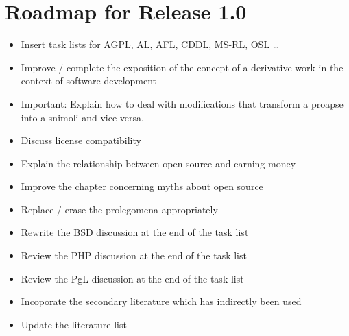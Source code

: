 %
%
%
%


\chapter*{Roadmap for Release 1.0} 

\begin{footnotesize}
\begin{itemize}
  \item Insert task lists for AGPL, AL, AFL, CDDL, MS-RL, OSL \ldots
  \item Improve / complete the exposition of the concept of a derivative work
    in the context of software development
  \item Important: Explain how to deal with modifications that transform
    a proapse into a snimoli and vice versa.
  \item Discuss license compatibility
  \item Explain the relationship between open source and earning money

  \item Improve the chapter concerning myths about open source

  \item Replace / erase the prolegomena appropriately
  \item Rewrite the BSD discussion at the end of the task list 

  \item Review the PHP discussion at the end of the task list
  \item Review the PgL discussion at the end of the task list

  \item Incoporate the secondary literature which has indirectly been used
  \item Update the literature list
\end{itemize}
\end{footnotesize}

%

